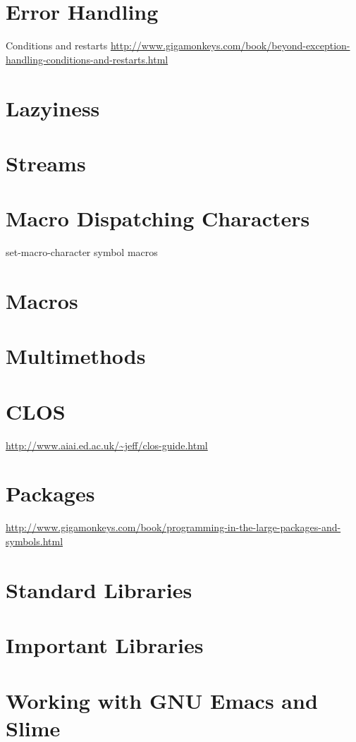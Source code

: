 \documentclass[11pt]{article}
\begin{document}
\section{Error Handling}
\label{sec-11}
Conditions and restarts
\url{http://www.gigamonkeys.com/book/beyond-exception-handling-conditions-and-restarts.html}

\section{Lazyiness}
\label{sec-12}
\section{Streams}
\label{sec-13}
\section{Macro Dispatching Characters}
\label{sec-14}
set-macro-character
symbol macros
\section{Macros}
\label{sec-15}
\section{Multimethods}
\label{sec-16}
\section{CLOS}
\label{sec-17}
\url{http://www.aiai.ed.ac.uk/~jeff/clos-guide.html}

\section{Packages}
\label{sec-18}
\url{http://www.gigamonkeys.com/book/programming-in-the-large-packages-and-symbols.html}
\section{Standard Libraries}
\label{sec-19}
\section{Important Libraries}
\label{sec-20}
\section{Working with GNU Emacs and Slime}
\label{sec-21}
\end{document}
